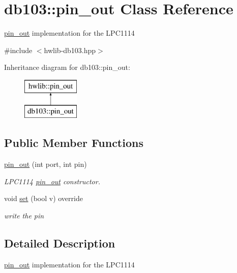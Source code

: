 \hypertarget{classdb103_1_1pin__out}{}\section{db103\+:\+:pin\+\_\+out Class Reference}
\label{classdb103_1_1pin__out}


\hyperlink{classdb103_1_1pin__out}{pin\+\_\+out} implementation for the L\+P\+C1114  




{\ttfamily \#include $<$hwlib-\/db103.\+hpp$>$}

Inheritance diagram for db103\+:\+:pin\+\_\+out\+:\begin{figure}[H]
\begin{center}
\leavevmode
\includegraphics[height=2.000000cm]{classdb103_1_1pin__out}
\end{center}
\end{figure}
\subsection*{Public Member Functions}
\begin{DoxyCompactItemize}
\item 
\hyperlink{classdb103_1_1pin__out_a344e7edf9ae6a0c030048075916218ec}{pin\+\_\+out} (int port, int pin)
\begin{DoxyCompactList}\small\item\em L\+P\+C1114 \hyperlink{classdb103_1_1pin__out}{pin\+\_\+out} constructor. \end{DoxyCompactList}\item 
void \hyperlink{classdb103_1_1pin__out_a73b6d2c8c5c11baf263f5c3cd8078ad9}{set} (bool v) override
\begin{DoxyCompactList}\small\item\em write the pin \end{DoxyCompactList}\end{DoxyCompactItemize}


\subsection{Detailed Description}
\hyperlink{classdb103_1_1pin__out}{pin\+\_\+out} implementation for the L\+P\+C1114 

